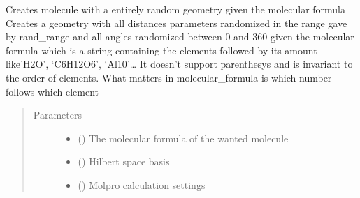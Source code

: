 \documentclass[letterpaper,10pt,english]{sphinxmanual}
\begin{document}
\begin{fulllineitems}
\label{\detokenize{molecular:molecular.random_molecule}}
\sphinxAtStartPar
Creates molecule with a entirely random geometry given the molecular formula
Creates a geometry with all distances parameters randomized in the range gave by rand\_range and all angles
randomized between 0 and 360 given the molecular formula which is a string containing the elements followed by its
amount like’H2O’, ‘C6H12O6’, ‘Al10’… It doesn’t support parenthesys and is invariant to the order of elements.
What matters in molecular\_formula is which number follows which element
\begin{quote}\begin{description}
\item[{Parameters}] \leavevmode\begin{itemize}
\item {} 
\sphinxAtStartPar
{} () \textendash{} The molecular formula of the wanted molecule

\item {} 
\sphinxAtStartPar
{} () \textendash{} Hilbert space basis

\item {} 
\sphinxAtStartPar
{} (\sphinxstyleliteralemphasis{\sphinxupquote{{[}}}\sphinxstyleliteralemphasis{\sphinxupquote{{]}}}) \textendash{} Molpro calculation settings


\end{itemize}
\end{description}
\end{quote}
\end{fulllineitems}
\end{document}
